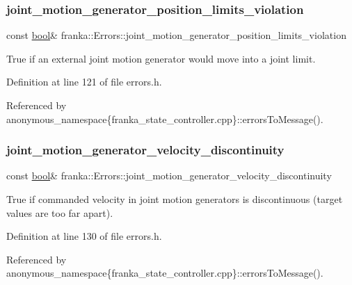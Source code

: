 \subsubsection{\texorpdfstring{joint\+\_\+motion\+\_\+generator\+\_\+position\+\_\+limits\+\_\+violation}{joint\_motion\_generator\_position\_limits\_violation}}
{\footnotesize\ttfamily const \hyperlink{classbool}{bool}\& franka\+::\+Errors\+::joint\+\_\+motion\+\_\+generator\+\_\+position\+\_\+limits\+\_\+violation}

True if an external joint motion generator would move into a joint limit. 

Definition at line 121 of file errors.\+h.



Referenced by anonymous\+\_\+namespace\{franka\+\_\+state\+\_\+controller.\+cpp\}\+::errors\+To\+Message().

\mbox{\label{structfranka_1_1Errors_abd6da8e6a32d817a7b4848a24efd9379}} 
\subsubsection{\texorpdfstring{joint\+\_\+motion\+\_\+generator\+\_\+velocity\+\_\+discontinuity}{joint\_motion\_generator\_velocity\_discontinuity}}
{\footnotesize\ttfamily const \hyperlink{classbool}{bool}\& franka\+::\+Errors\+::joint\+\_\+motion\+\_\+generator\+\_\+velocity\+\_\+discontinuity}

True if commanded velocity in joint motion generators is discontinuous (target values are too far apart). 

Definition at line 130 of file errors.\+h.



Referenced by anonymous\+\_\+namespace\{franka\+\_\+state\+\_\+controller.\+cpp\}\+::errors\+To\+Message().

\mbox{\label{structfranka_1_1Errors_ae211638df9b0e23905c8a9d36e249207}} 
